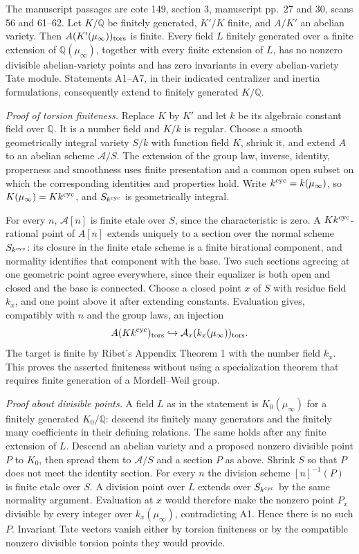 \documentclass[11pt,a4paper]{article}
\begin{document}
The manuscript passages are cote 149, section 3, manuscript pp.~27 and 30, scans 56 and 61--62.
Let $K/\mathbb Q$ be finitely generated, $K'/K$ finite, and $A/K'$ an abelian variety. Then $A(K'(\mu_\infty))_{\rm tors}$ is finite. Every field $L$ finitely generated over a finite extension of $\mathbb Q(\mu_\infty)$, together with every finite extension of $L$, has no nonzero divisible abelian-variety points and has zero invariants in every abelian-variety Tate module. Statements A1--A7, in their indicated centralizer and inertia formulations, consequently extend to finitely generated $K/\mathbb Q$.

\emph{Proof of torsion finiteness.} Replace $K$ by $K'$ and let $k$ be its algebraic constant field over $\mathbb Q$. It is a number field and $K/k$ is regular. Choose a smooth geometrically integral variety $S/k$ with function field $K$, shrink it, and extend $A$ to an abelian scheme $\mathcal A/S$. The extension of the group law, inverse, identity, properness and smoothness uses finite presentation and a common open subset on which the corresponding identities and properties hold. Write $k^{\rm cyc}=k(\mu_\infty)$, so $K(\mu_\infty)=Kk^{\rm cyc}$, and $S_{k^{\rm cyc}}$ is geometrically integral.

For every $n$, $\mathcal A[n]$ is finite etale over $S$, since the characteristic is zero. A $Kk^{\rm cyc}$-rational point of $A[n]$ extends uniquely to a section over the normal scheme $S_{k^{\rm cyc}}$: its closure in the finite etale scheme is a finite birational component, and normality identifies that component with the base. Two such sections agreeing at one geometric point agree everywhere, since their equalizer is both open and closed and the base is connected. Choose a closed point $x$ of $S$ with residue field $k_x$, and one point above it after extending constants. Evaluation gives, compatibly with $n$ and the group laws, an injection
\[
 A(Kk^{\rm cyc})_{\rm tors}\hookrightarrow
 \mathcal A_x(k_x(\mu_\infty))_{\rm tors}.
\]
The target is finite by Ribet's Appendix Theorem 1 with the number field $k_x$. This proves the asserted finiteness without using a specialization theorem that requires finite generation of a Mordell--Weil group.

\emph{Proof about divisible points.} A field $L$ as in the statement is $K_0(\mu_\infty)$ for a finitely generated $K_0/\mathbb Q$: descend its finitely many generators and the finitely many coefficients in their defining relations. The same holds after any finite extension of $L$. Descend an abelian variety and a proposed nonzero divisible point $P$ to $K_0$, then spread them to $\mathcal A/S$ and a section $P$ as above. Shrink $S$ so that $P$ does not meet the identity section. For every $n$ the division scheme $[n]^{-1}(P)$ is finite etale over $S$. A division point over $L$ extends over $S_{k^{\rm cyc}}$ by the same normality argument. Evaluation at $x$ would therefore make the nonzero point $P_x$ divisible by every integer over $k_x(\mu_\infty)$, contradicting A1. Hence there is no such $P$. Invariant Tate vectors vanish either by torsion finiteness or by the compatible nonzero divisible torsion points they would provide.
\end{document}
